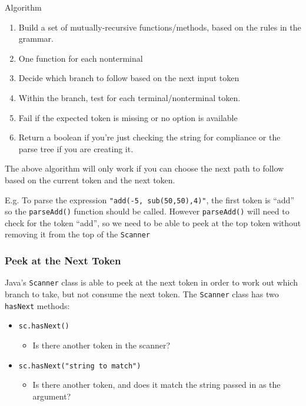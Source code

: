 \documentclass[
]{book}
\providecommand{\tightlist}{%
  \setlength{\itemsep}{0pt}\setlength{\parskip}{0pt}}
\begin{document}
Algorithm

\begin{enumerate}
\def\labelenumi{\arabic{enumi}.}
\tightlist
\item
  Build a set of mutually-recursive functions/methods, based on the rules in the grammar.
\item
  One function for each nonterminal
\item
  Decide which branch to follow based on the next input token
\item
  Within the branch, test for each terminal/nonterminal token.
\item
  Fail if the expected token is missing or no option is available
\item
  Return a boolean if you're just checking the string for compliance or the parse tree if you are creating it.
\end{enumerate}

The above algorithm will only work if you can choose the next path to follow based on the current token and the next token.

E.g. To parse the expression \texttt{"add(-5,\ sub(50,50),4)"}, the first token is ``add'' so the \texttt{parseAdd()} function should be called. However \texttt{parseAdd()} will need to check for the token ``add'', so we need to be able to peek at the top token without removing it from the top of the \texttt{Scanner}

\hypertarget{peek-at-the-next-token}{%
\subsubsection{Peek at the Next Token}\label{peek-at-the-next-token}}

Java's \texttt{Scanner} class is able to peek at the next token in order to work out which branch to take, but not consume the next token. The \texttt{Scanner} class has two \texttt{hasNext} methods:

\begin{itemize}
\tightlist
\item
  \texttt{sc.hasNext()}

  \begin{itemize}
  \tightlist
  \item
    Is there another token in the scanner?
  \end{itemize}
\item
  \texttt{sc.hasNext("string\ to\ match")}

  \begin{itemize}
  \tightlist
  \item
    Is there another token, and does it match the string passed in as the argument?
  \end{itemize}
\end{itemize}
\end{document}
